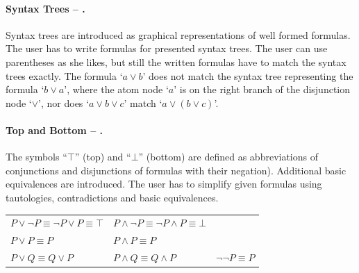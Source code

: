 \paragraph{Syntax Trees – .}
\label{tut:24}
Syntax trees  are introduced as graphical representations of well formed formulas. 
The user has to write formulas for presented syntax trees. 
The user can use parentheses as she likes, but still the written formulas have to match the syntax trees exactly. 
The formula ‘$a \vee b$’ does not match the syntax tree representing the formula ‘$b \vee a$’, 
where the atom node ‘$a$’ is on the right branch of the disjunction node ‘$\vee$’,
nor does ‘$a \vee b \vee c$’ match ‘$a \vee (b \vee c)$’.

\paragraph{Top and Bottom – .}
\label{tut:25}
The symbols “$\top$” (top) and “$ \bot$” (bottom) are defined
as abbreviations of conjunctions and disjunctions 
of formulas with their negation). Additional basic equivalences are introduced.
The user has to simplify given formulas using tautologies, contradictions and basic equivalences.
\begin{center}
\begin{tabular}{lll}
$P \vee \neg P \equiv \neg P \vee P\equiv \top$  &
$P \wedge \neg P \equiv \neg P \wedge P \equiv  \bot$\\
$P \vee P \equiv P$ &
$P \wedge P \equiv P$\\
$P \vee Q \equiv Q \vee P$ &
$P \wedge Q \equiv Q \wedge P$ &
$\neg \neg P \equiv P$
\end{tabular}
\end{center}




%
%
%
%

